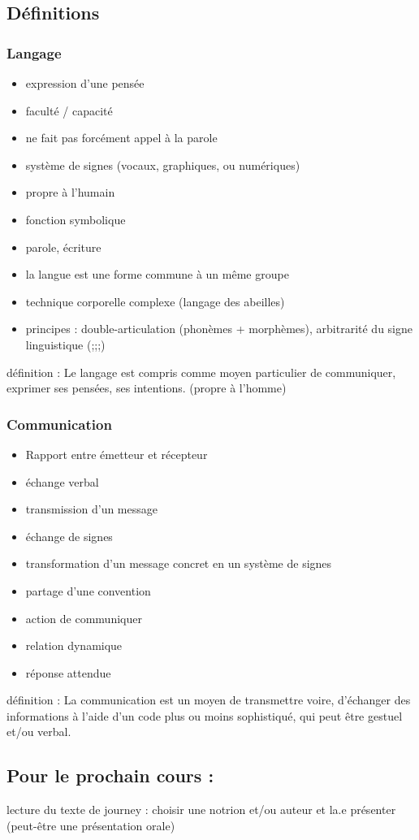 \subsection{Définitions}
\subsubsection{Langage}  
\begin{itemize}
   \item expression d'une pensée 
   \item faculté / capacité 
   \item ne fait pas forcément appel à la parole
   \item système de signes (vocaux, graphiques, ou numériques)
   \item propre à l'humain
   \item fonction symbolique
   \item parole, écriture
   \item la langue est une forme commune à un même groupe
   \item technique corporelle complexe (langage des abeilles)
   \item principes :
      double-articulation (phonèmes + morphèmes), arbitrarité du signe linguistique (;;;)
\end{itemize}

   définition :
   Le langage est compris comme moyen particulier de communiquer, exprimer ses pensées, ses intentions. (propre à l'homme)



\subsubsection{Communication}
\begin{itemize}
   \item Rapport entre émetteur et récepteur
   \item échange verbal
   \item transmission d'un message
   \item échange de signes
   \item transformation d'un message concret en un système de signes
   \item partage d'une convention 
   \item action de communiquer
   \item relation dynamique
   \item réponse attendue
\end{itemize}

   définition :
   La communication est un moyen de transmettre voire, d'échanger des informations à l'aide d'un code plus ou moins sophistiqué, qui peut être gestuel et/ou verbal.

\subsection{Pour le prochain cours :}
lecture  du texte de journey :
choisir une notrion et/ou auteur et la.e présenter
(peut-être une présentation orale)
